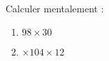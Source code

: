 
\begin{exercice}\label{exosmath-0762}

Calculer mentalement :
\begin{enumerate}
    \item
        \( 98\times 30\)
    \item
        \( \times 104\times 12\)
\end{enumerate}

\end{exercice}
